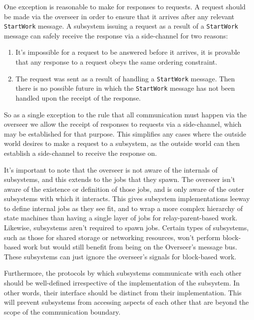 One exception is reasonable to make for responses to requests. A request should
be made via the overseer in order to ensure that it arrives after any relevant
\verb|StartWork| message. A subsystem issuing a request as a result of a
\verb|StartWork| message can safely receive the response via a side-channel for
two reasons:

\begin{enumerate}
    \item It's impossible for a request to be answered before it arrives, it is
    provable that any response to a request obeys the same ordering constraint.
    \item The request was sent as a result of handling a \verb|StartWork|
    message. Then there is no possible future in which the \verb|StartWork|
    message has not been handled upon the receipt of the response.
\end{enumerate}

So as a single exception to the rule that all communication must happen via the
overseer we allow the receipt of responses to requests via a side-channel, which
may be established for that purpose. This simplifies any cases where the outside
world desires to make a request to a subsystem, as the outside world can then
establish a side-channel to receive the response on.
\newline

It's important to note that the overseer is not aware of the internals of
subsystems, and this extends to the jobs that they spawn. The overseer isn't
aware of the existence or definition of those jobs, and is only aware of the
outer subsystems with which it interacts. This gives subsystem implementations
leeway to define internal jobs as they see fit, and to wrap a more complex
hierarchy of state machines than having a single layer of jobs for
relay-parent-based work. Likewise, subsystems aren't required to spawn jobs.
Certain types of subsystems, such as those for shared storage or networking
resources, won't perform block-based work but would still benefit from being on
the Overseer's message bus. These subsystems can just ignore the overseer's
signals for block-based work.
\newline

Furthermore, the protocols by which subsystems communicate with each other
should be well-defined irrespective of the implementation of the subsystem. In
other words, their interface should be distinct from their implementation. This
will prevent subsystems from accessing aspects of each other that are beyond the
scope of the communication boundary.

